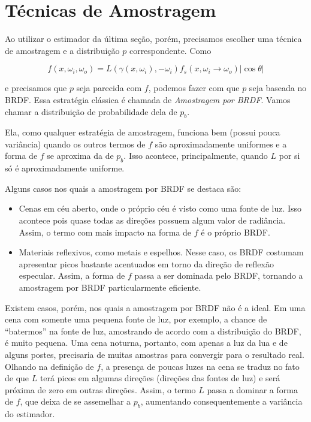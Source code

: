 \section{Técnicas de Amostragem}

Ao utilizar o estimador da última seção, porém, precisamos escolher uma técnica de
amostragem e a distribuição $p$ correspondente. Como

\[
  f(x, \omega_i, \omega_o) = L(\gamma(x, \omega_i), -\omega_i) f_s(x, \omega_i
  \rightarrow \omega_o) | \cos \theta |
\]

e precisamos que $p$ seja parecida com $f$, podemos fazer com que $p$ seja
baseada no BRDF. Essa estratégia clássica é chamada de \emph{Amostragem por
BRDF}. Vamos chamar a distribuição de probabilidade dela de  $p_b$.

Ela, como qualquer estratégia de amostragem, funciona bem (possui pouca
variância) quando os outros termos de $f$ são aproximadamente uniformes e a
forma de $f$ se aproxima da de $p_b$. Isso acontece, principalmente, quando $L$
por si só é aproximadamente uniforme.

Alguns casos nos quais a amostragem por BRDF se destaca são:

\begin{itemize}
  \item Cenas em céu aberto, onde o próprio céu é visto como uma
      fonte de luz. Isso acontece pois quase todas as direções possuem algum
      valor de radiância. Assim, o termo com mais impacto na forma de $f$ é o
      próprio BRDF.
  \item Materiais reflexivos, como metais e espelhos. Nesse
      caso, os BRDF costumam apresentar picos bastante acentuados em torno
      da direção de reflexão especular. Assim, a forma de $f$ passa a ser
      dominada pelo BRDF, tornando a amostragem por BRDF particularmente
      eficiente.
\end{itemize}

Existem casos, porém, nos quais a amostragem por BRDF não é a ideal. Em uma cena
com somente uma pequena fonte de luz, por exemplo, a chance de ``batermos'' na
fonte de luz, amostrando de acordo com a distribuição do BRDF, é muito pequena.
Uma cena noturna, portanto, com apenas a luz da lua e de alguns postes,
precisaria de muitas amostras para convergir para o resultado real. Olhando na
definição de $f$, a presença de poucas luzes na cena se traduz no fato de que
$L$ terá picos em algumas direções (direções das fontes de luz) e será próxima
de zero em outras direções. Assim, o termo $L$ passa a dominar a forma de $f$,
que deixa de se assemelhar a $p_b$, aumentando consequentemente a variância do
estimador.

